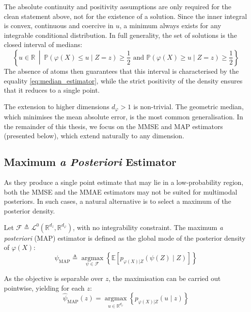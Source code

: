 \begin{remark}
	The absolute continuity and positivity assumptions are only required for the clean statement above, not for the existence of a solution. Since the inner integral is convex, continuous and coercive in $u$, a minimum always exists for any integrable conditional distribution. In full generality, the set of solutions is the closed interval of medians:
	\begin{equation}
		\left\{u\in\mathbb{R}\:\middle|\:\mathbb{P}(\varphi(X)\leq u\mid Z=z)\geq\frac{1}{2}\text{ and }\mathbb{P}(\varphi(X)\geq u\mid Z=z)\geq\frac{1}{2}\right\}
	\end{equation}
	The absence of atoms then guarantees that this interval is characterised by the equality \eqref{eq:median_estimator}, while the strict positivity of the density ensures that it reduces to a single point.
\end{remark}

\begin{remark}
	The extension to higher dimensions $d_{\varphi}>1$ is non-trivial. The geometric median, which minimises the mean absolute error, is the most common generalisation. In the remainder of this thesis, we focus on the MMSE and MAP estimators (presented below), which extend naturally to any dimension.
\end{remark}

\subsection{Maximum \textit{a Posteriori} Estimator}

As they produce a single point estimate that may lie in a low-probability region, both the MMSE and the MMAE estimators may not be suited for multimodal posteriors. In such cases, a natural alternative is to select a maximum of the posterior density.

Let $\mathcal{F}\triangleq\mathcal{L}^0\left(\mathbb{R}^{d_z},\mathbb{R}^{d_{\varphi}}\right)$, with no integrability constraint. The maximum \textit{a posteriori} (MAP) estimator is defined as the global mode of the posterior density of $\varphi(X)$:
\begin{equation}
	\hat{\psi}_{\mathrm{MAP}}\triangleq\underset{\psi\in\mathcal{F}}{\operatorname{argmax}}\left\{\mathbb{E}\left[p_{\varphi(X)|Z}(\psi(Z)\mid Z)\right]\right\}
\end{equation}

As the objective is separable over $z$, the maximisation can be carried out pointwise, yielding for each $z$:
\begin{equation}
	\hat{\psi}_{\mathrm{MAP}}(z)=\underset{u\in\mathbb{R}^{d_{\varphi}}}{\operatorname{argmax}}\left\{p_{\varphi(X)|Z}(u\mid z)\right\}
\end{equation}

